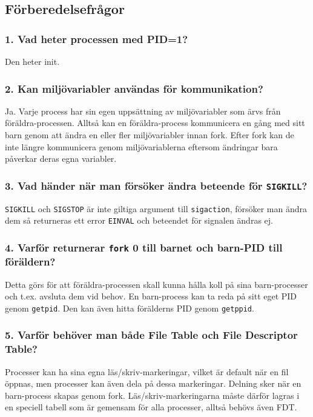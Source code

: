 \documentclass[a4paper]{article}
\begin{document}
\subsection*{Förberedelsefrågor}
\subsubsection*{1. Vad heter processen med PID=1?}
Den heter init.

\subsubsection*{2. Kan miljövariabler användas för kommunikation?}
Ja. Varje process har sin egen uppsättning av miljövariabler som ärvs från föräldra-processen. Alltså kan en föräldra-process kommunicera en gång med sitt barn genom att ändra en eller fler miljövariabler innan fork. Efter fork kan de inte längre kommunicera genom miljövariablerna eftersom ändringar bara påverkar deras egna variabler.

\subsubsection*{3. Vad händer när man försöker ändra beteende för \texttt{SIGKILL}?}
\texttt{SIGKILL} och \texttt{SIGSTOP} är inte giltiga argument till \texttt{sigaction}, försöker man ändra dem så returneras ett error \texttt{EINVAL} och beteendet för signalen ändras ej.

\subsubsection*{4. Varför returnerar \texttt{fork} 0 till barnet och barn-PID till föräldern?}
Detta görs för att föräldra-processen skall kunna hålla koll på sina barn-processer och t.ex. avsluta dem vid behov.
En barn-process kan ta reda på sitt eget PID genom \texttt{getpid}. Den kan även hitta förälderns PID genom \texttt{getppid}.

\subsubsection*{5. Varför behöver man både File Table och File Descriptor Table?}
Processer kan ha sina egna läs/skriv-markeringar, vilket är default när en fil öppnas, men processer kan även dela på dessa markeringar. Delning sker när en barn-process skapas genom fork. Läs/skriv-markeringarna måste därför lagras i en speciell tabell som är gemensam för alla processer, alltså behövs även FDT.
\end{document}
